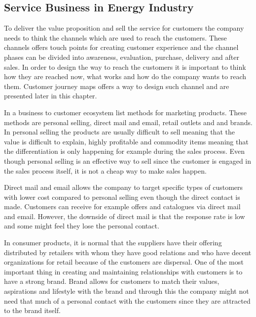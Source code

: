 \subsection{Service Business in Energy Industry}

To deliver the value proposition and sell the service for customers the company needs to think the channels which are used to reach the customers. These channels offers touch points for creating customer experience and the channel phases can be divided into awareness, evaluation, purchase, delivery and after sales. In order to design the way to reach the customers it is important to think how they are reached now, what works and how do the company wants to reach them. \parencite{BusinessModelGeneration:2010} Customer journey maps offers a way to design such channel and are presented later in this chapter.

In a business to customer ecosystem \textcite{MarketingPlans:2016} list methods for marketing products. These methods are personal selling, direct mail and email, retail outlets and and brands. In personal selling the products are usually difficult to sell meaning that the value is difficult to explain, highly profitable and commodity items meaning that the differentiation is only happening for example during the sales process. Even though personal selling is an effective way to sell since the customer is engaged in the sales process itself, it is not a cheap way to make sales happen.

Direct mail and email allows the company to target specific types of customers with lower cost compared to personal selling even though the direct contact is made. Customers can receive for example offers and catalogues via direct mail and email. However, the downside of direct mail is that the response rate is low and some might feel they lose the personal contact. \parencite{MarketingPlans:2016}

In consumer products, it is normal that the suppliers have their offering distributed by retailers with whom they have good relations and who have decent organizations for retail because of the customers are dispersal. One of the most important thing in creating and maintaining relationships with customers is to have a strong brand. Brand allows for customers to match their values, aspirations and lifestyle with the brand and through this the company might not need that much of a personal contact with the customers since they are attracted to the brand itself. \parencite{MarketingPlans:2016}

